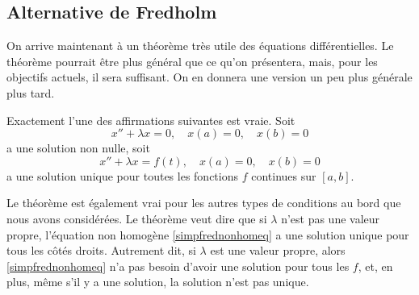 %



\subsection{Alternative de Fredholm}

On arrive maintenant à un théorème très utile des équations différentielles. Le théorème pourrait être plus général que ce qu'on présentera, mais, pour les objectifs actuels, il sera suffisant. On en donnera une version un peu plus générale plus tard.

\begin{theorem}
\label{thm:fredholmsimple}
Exactement l'une des affirmations suivantes est vraie.
Soit
\begin{equation} \label{simpfredhomeq}
x'' + \lambda x = 0, \quad x(a) = 0, \quad x(b) = 0
\end{equation}
a une solution non nulle, soit
\begin{equation} \label{simpfrednonhomeq}
x'' + \lambda x = f(t), \quad x(a) = 0, \quad x(b) = 0
\end{equation}
a une solution unique pour toutes les fonctions $f$ continues sur $[a,b]$.
\end{theorem}

Le théorème est également vrai pour les autres types de
conditions au bord que nous avons considérées.
Le théorème veut dire que si  $\lambda$ n'est pas une valeur propre, l'équation non homogène  \eqref{simpfrednonhomeq} a une solution unique pour tous les côtés droits. Autrement dit, si $\lambda$ est une valeur propre, alors  
\eqref{simpfrednonhomeq} n'a pas besoin d'avoir une solution pour tous les $f$,
et, en plus, même s'il y a une solution, la solution n'est pas unique.

